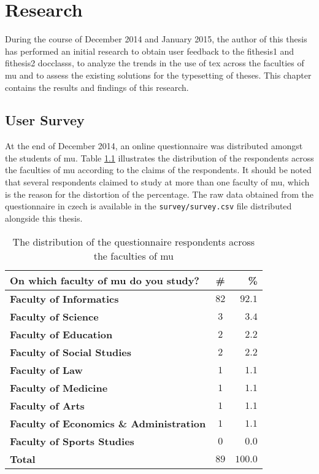 \chapter{Research}
During the course of December 2014 and January 2015, the author of this thesis has performed an initial research to obtain user feedback to the fithesis1 and fithesis2 \glspl{docclass}, to analyze the trends in the use of \gls{tex} across the faculties of \gls{mu} and to assess the existing solutions for the typesetting of theses. This chapter contains the results and findings of this research.

  \section{User Survey}
  At the end of December 2014, an online questionnaire was distributed amongst the students of \gls{mu}. Table \ref{table:survey-faculty} illustrates the distribution of the respondents across the faculties of \gls{mu} according to the claims of the respondents. It should be noted that several respondents claimed to study at more than one faculty of \gls{mu}, which is the reason for the distortion of the percentage. The raw data obtained from the questionnaire in czech is available in the \texttt{survey/survey.csv} file distributed alongside this thesis.

  \begin{table}
    \begin{tabularx}{\textwidth}{Xcr}
      \textbf{On which faculty of \gls{mu} do you study?} & \textbf{\#} & \textbf{\%} \\
      \hline
      \textbf{Faculty of Informatics}                  & $82$          & $92.1$ \\
      \textbf{Faculty of Science}                      &  $3$          &  $3.4$ \\
      \textbf{Faculty of Education}                    &  $2$          &  $2.2$ \\
      \textbf{Faculty of Social Studies}               &  $2$          &  $2.2$ \\
      \textbf{Faculty of Law}                          &  $1$          &  $1.1$ \\
      \textbf{Faculty of Medicine}                     &  $1$          &  $1.1$ \\
      \textbf{Faculty of Arts}                         &  $1$          &  $1.1$ \\
      \textbf{Faculty of Economics \& Administration}  &  $1$          &  $1.1$ \\
      \textbf{Faculty of Sports Studies}               &  $0$          &  $0.0$ \\
      \hline
      \textbf{Total}                        & \textbf{$89$} & \textbf{$100.0$}
    \end{tabularx}
    \caption{The distribution of the questionnaire respondents across the faculties of \gls{mu}}
    \label{table:survey-faculty}
  \end{table}

